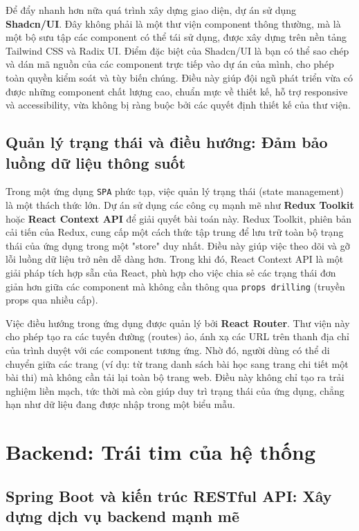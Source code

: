 \documentclass[../DoAn.tex]{subfiles}
\begin{document}
Để đẩy nhanh hơn nữa quá trình xây dựng giao diện, dự án sử dụng \textbf{Shadcn/UI}. Đây không phải là một thư viện component thông thường, mà là một bộ sưu tập các component có thể tái sử dụng, được xây dựng trên nền tảng Tailwind CSS và Radix UI. Điểm đặc biệt của Shadcn/UI là bạn có thể sao chép và dán mã nguồn của các component trực tiếp vào dự án của mình, cho phép toàn quyền kiểm soát và tùy biến chúng. Điều này giúp đội ngũ phát triển vừa có được những component chất lượng cao, chuẩn mực về thiết kế, hỗ trợ responsive và accessibility, vừa không bị ràng buộc bởi các quyết định thiết kế của thư viện.

\subsection{Quản lý trạng thái và điều hướng: Đảm bảo luồng dữ liệu thông suốt}

Trong một ứng dụng \texttt{SPA} phức tạp, việc quản lý trạng thái (state management) là một thách thức lớn. Dự án sử dụng các công cụ mạnh mẽ như \textbf{Redux Toolkit} hoặc \textbf{React Context API} để giải quyết bài toán này. Redux Toolkit, phiên bản cải tiến của Redux, cung cấp một cách thức tập trung để lưu trữ toàn bộ trạng thái của ứng dụng trong một "store" duy nhất. Điều này giúp việc theo dõi và gỡ lỗi luồng dữ liệu trở nên dễ dàng hơn. Trong khi đó, React Context API là một giải pháp tích hợp sẵn của React, phù hợp cho việc chia sẻ các trạng thái đơn giản hơn giữa các component mà không cần thông qua \texttt{props drilling} (truyền props qua nhiều cấp).

Việc điều hướng trong ứng dụng được quản lý bởi \textbf{React Router}. Thư viện này cho phép tạo ra các tuyến đường (routes) ảo, ánh xạ các URL trên thanh địa chỉ của trình duyệt với các component tương ứng. Nhờ đó, người dùng có thể di chuyển giữa các trang (ví dụ: từ trang danh sách bài học sang trang chi tiết một bài thi) mà không cần tải lại toàn bộ trang web. Điều này không chỉ tạo ra trải nghiệm liền mạch, tức thời mà còn giúp duy trì trạng thái của ứng dụng, chẳng hạn như dữ liệu đang được nhập trong một biểu mẫu.

\section{Backend: Trái tim của hệ thống}

\subsection{Spring Boot và kiến trúc RESTful API: Xây dựng dịch vụ backend mạnh mẽ}
\end{document}

